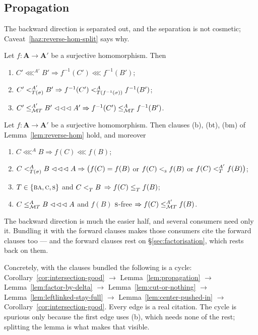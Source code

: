 \subsection{Propagation}

The backward direction is separated out, and the separation is not cosmetic;
Caveat~\ref{haz:reverse-hom-split} says why.

\begin{lemma}\label{lem:reverse-hom}
Let $f\colon\mathbf A\to\mathbf A'$ be a surjective homomorphism. Then
\begin{enumerate}\tightlist
\item[\textup{(b)}] $C'\lll^{A'}B'\Rightarrow f^{-1}(C')\lll f^{-1}(B')$;
\item[\textup{(bt)}] $C'\subt[A']{T(\sigma)}B'\Rightarrow
  f^{-1}(C')\subt[A]{T(f^{-1}(\sigma))}f^{-1}(B')$;
\item[\textup{(bm)}] $C'\subte[A']{\MT T}B'\lll A'\Rightarrow
  f^{-1}(C')\subte[A]{\MT T}f^{-1}(B')$.
\end{enumerate}
\end{lemma}

\begin{longlemma}\label{lem:propagation}
Let $f\colon\mathbf A\to\mathbf A'$ be a surjective homomorphism. Then
clauses \textup{(b)}, \textup{(bt)}, \textup{(bm)} of
Lemma~\ref{lem:reverse-hom} hold, and moreover
\begin{enumerate}\tightlist
\item[\textup{(f)}] $C\lll^{A}B\Rightarrow f(C)\lll f(B)$;
\item[\textup{(ft)}] $C\subt[A]{T(\sigma)}B\lll A\Rightarrow
  \bigl(f(C)=f(B)$ or $f(C)\subt{\TS}f(B)$ or
  $f(C)\subt[A']{T}f(B)\bigr)$;
\item[\textup{(fs)}] $T\in\{\TBA,\TC,\TS\}$ and $C\subt{T}B$
  $\Rightarrow f(C)\subte{T}f(B)$;
\item[\textup{(fm)}] $C\subte[A]{\MT T}B\lll A$ and $f(B)$ $\TS$-free
  $\Rightarrow f(C)\subte[A']{\MT T}f(B)$.
\end{enumerate}
\end{longlemma}

\begin{hazard}
\label{haz:reverse-hom-split}
The backward direction is much the easier half, and several consumers need only
it. Bundling it with the forward clauses makes those consumers cite the forward
clauses too --- and the forward clauses rest on \S\ref{sec:factorisation},
which rests back on them.

Concretely, with the clauses bundled the following is a cycle:
Corollary~\ref{cor:intersection-good} $\to$ Lemma~\ref{lem:propagation} $\to$
Lemma~\ref{lem:factor-by-delta} $\to$ Lemma~\ref{lem:cut-or-nothing} $\to$
Lemma~\ref{lem:leftlinked-stay-full} $\to$ Lemma~\ref{lem:center-pushed-in}
$\to$ Corollary~\ref{cor:intersection-good}. Every edge is a real citation. The
cycle is spurious only because the first edge uses (b), which needs none of the
rest; splitting the lemma is what makes that visible.

\end{hazard}

